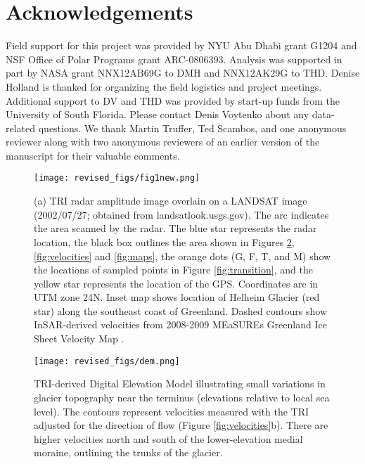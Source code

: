 \documentclass[review]{igs}
\begin{document}




\section{Acknowledgements}
Field support for this project was provided by NYU Abu Dhabi grant G1204 and NSF Office of Polar Programs grant ARC-0806393.  Analysis was supported in part by NASA grant NNX12AB69G to DMH and NNX12AK29G to THD.  Denise Holland is thanked for organizing the field logistics and project meetings. Additional support to DV and THD was provided by start-up funds from the University of South Florida. Please contact Denis Voytenko about any data-related questions. We thank Martin Truffer, Ted Scambos, and one anonymous reviewer along with two anonymous reviewers of an earlier version of the manuscript for their valuable comments.



\newpage

% 
% 
% 
\newpage


\begin{figure}
\centering
\texttt{[image: revised\_figs/fig1new.png]}
\caption{(a) TRI radar amplitude image overlain on a LANDSAT image (2002/07/27; obtained from landsatlook.usgs.gov). The arc indicates the area scanned by the radar. The blue star represents the radar location, the black box outlines the area shown in Figures \ref{fig:DEM}, \ref{fig:velocities} and \ref{fig:maps}, the orange dots (G, F, T, and M) show the locations of sampled points in Figure \ref{fig:transition}, and the yellow star represents the location of the GPS. Coordinates are in UTM zone 24N. Inset map shows location of Helheim Glacier (red star) along the southeast coast of Greenland. Dashed contours show InSAR-derived velocities from 2008-2009 MEaSUREs Greenland Ice Sheet Velocity Map \citep{joughin2010measures,joughin2010greenland}.}
\label{fig:sitelocation}
\end{figure}

\begin{figure}
\centering
\texttt{[image: revised\_figs/dem.png]}
\caption{TRI-derived Digital Elevation Model illustrating small variations in glacier topography near the terminus (elevations relative to local sea level). The contours represent velocities measured with the TRI adjusted for the direction of flow (Figure \ref{fig:velocities}b). There are higher velocities north and south of the lower-elevation medial moraine, outlining the trunks of the glacier. }
\label{fig:DEM}
\end{figure}
\end{document}
